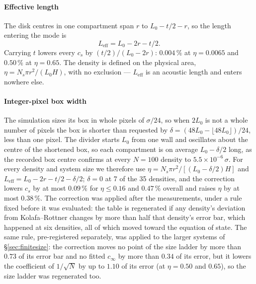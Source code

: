 \documentclass[journal]{IEEEtran}
\begin{document}
\paragraph{Effective length} The disk centres in one compartment span $r$ to $L_0 - t/2 - r$, so the
length entering the mode is
\begin{equation}
L_{\mathrm{eff}} = L_0 - 2r - t/2 .
\label{eq:leff}
\end{equation}
Carrying $t$ lowers every $c_s$ by $(t/2)/(L_0-2r)$: $0.004\,\%$ at $\eta = 0.0065$ and $0.50\,\%$
at $\eta = 0.65$. The density is defined on the physical area, $\eta = N_s\pi r^2/(L_0H)$, with no
exclusion --- $L_{\mathrm{eff}}$ is an acoustic length and enters nowhere else.

\paragraph{Integer-pixel box width} The simulation sizes its box in whole pixels of $\sigma/24$, so when
$2L_0$ is not a whole number of pixels the box is shorter than requested by
$\delta = (48L_0 - \lfloor 48L_0 \rfloor)/24$, less than one pixel. The divider starts $L_0$ from one wall
and oscillates about the centre of the shortened box, so each compartment is on average $L_0 - \delta/2$
long, as the recorded box centre confirms at every $N = 100$ density to $5.5\times10^{-6}\,\sigma$. For every density and system
size we therefore use $\eta = N_s\pi r^2/[(L_0 - \delta/2)H]$ and
$L_{\mathrm{eff}} = L_0 - 2r - t/2 - \delta/2$; $\delta = 0$ at 7 of the 35 densities, and the
correction lowers $c_s$ by at most $0.09\,\%$ for $\eta \le 0.16$ and $0.47\,\%$ overall and raises
$\eta$ by at most $0.38\,\%$. The correction was applied after the measurements, under a rule fixed
before it was evaluated: the table is regenerated if any density's deviation from Kolafa--Rottner changes
by more than half that density's error bar, which happened at six densities, all of which moved
toward the equation of state. The same rule, pre-registered separately, was applied to
the larger systems of \S\ref{sec:finitesize}: the correction moves no point of the size ladder by more than $0.73$
of its error bar and no fitted $c_\infty$ by more than $0.34$ of its error, but it lowers the coefficient of
$1/\sqrt N$ by up to $1.10$ of its error (at $\eta = 0.50$ and $0.65$), so the size ladder was regenerated too.
\end{document}
